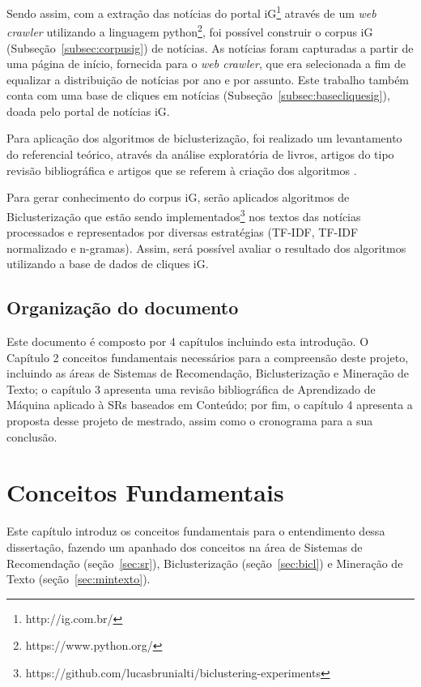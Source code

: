 \documentclass[normaltoc, espacoumemeio, pnumromarab,ruledheader]{abnt}
\begin{document}
Sendo assim, com a extração das notícias do portal iG\footnote{http://ig.com.br/} através de um \textit{web crawler} utilizando a linguagem python\footnote{https://www.python.org/}, foi possível construir o corpus iG (Subseção~\ref{subsec:corpusig}) de notícias.
As notícias foram capturadas a partir de uma página de início, fornecida para o \textit{web crawler}, que era selecionada a fim de equalizar a distribuição de notícias por ano e por assunto. Este trabalho também conta com uma base de cliques em notícias (Subseção~\ref{subsec:basecliquesig}), doada pelo portal de notícias iG.

Para aplicação dos algoritmos de biclusterização, foi realizado um levantamento do referencial teórico, através da análise exploratória de livros, artigos do tipo revisão bibliográfica e artigos que se referem à criação dos algoritmos \cite{Cheng2000,Tanay2005,Madeira2004,Santamaria2007,Kluger2003,Prelic2006}.

Para gerar conhecimento do corpus iG, serão aplicados algoritmos de Biclusterização que estão sendo implementados\footnote{https://github.com/lucasbrunialti/biclustering-experiments} nos textos das notícias processados e representados por diversas estratégias (TF-IDF, TF-IDF normalizado e n-gramas). Assim, será possível avaliar o resultado dos algoritmos utilizando a base de dados de cliques iG.

\section{Organização do documento}

Este documento é composto por 4 capítulos incluindo esta introdução. O Capítulo 2 conceitos fundamentais necessários para a compreensão deste projeto, incluindo as áreas de Sistemas de Recomendação, Biclusterização e Mineração de Texto; o capítulo 3 apresenta uma revisão bibliográfica de Aprendizado de Máquina aplicado à SRs baseados em Conteúdo; por fim, o capítulo 4 apresenta a proposta desse projeto de mestrado, assim como o cronograma para a sua conclusão.

\chapter{Conceitos Fundamentais}

Este capítulo introduz os conceitos fundamentais para o entendimento dessa dissertação, fazendo um apanhado dos conceitos na área de Sistemas de Recomendação (seção~\ref{sec:sr}), Biclusterização (seção~\ref{sec:bicl}) e Mineração de Texto (seção~\ref{sec:mintexto}).
\end{document}
